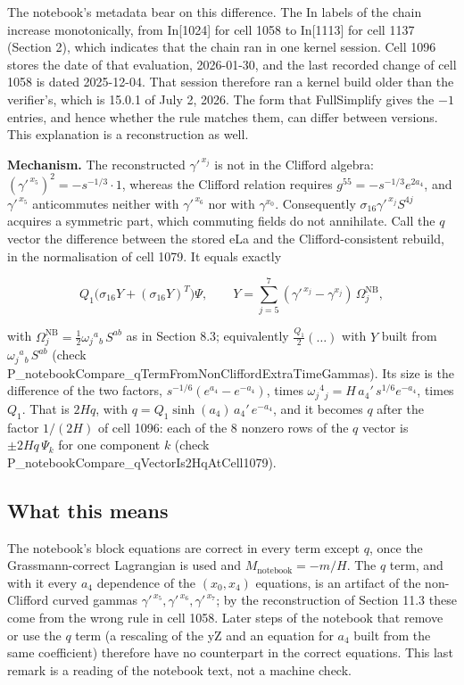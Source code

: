 \documentclass[11pt]{article}
\begin{document}
The notebook's metadata bear on this difference. The In labels of the chain increase monotonically, from In[1024] for cell 1058 to In[1113] for cell 1137 (Section 2), which indicates that the chain ran in one kernel session. Cell 1096 stores the date of that evaluation, 2026-01-30, and the last recorded change of cell 1058 is dated 2025-12-04. That session therefore ran a kernel build older than the verifier's, which is 15.0.1 of July 2, 2026. The form that FullSimplify gives the $-1$ entries, and hence whether the rule matches them, can differ between versions. This explanation is a reconstruction as well.

\textbf{Mechanism.} The reconstructed $\gamma'^{\,x_j}$ is not in the Clifford algebra: $(\gamma'^{\,x_5})^2=-s^{-1/3}\cdot1$, whereas the Clifford relation requires $g^{55}=-s^{-1/3}e^{2a_4}$, and $\gamma'^{\,x_5}$ anticommutes neither with $\gamma'^{\,x_6}$ nor with $\gamma^{x_0}$. Consequently $\sigma_{16}\gamma'^{\,x_j}S^{4j}$ acquires a symmetric part, which commuting fields do not annihilate. Call the $q$ vector the difference between the stored eLa and the Clifford-consistent rebuild, in the normalisation of cell 1079. It equals exactly

\[
Q_1\bigl(\sigma_{16}Y+(\sigma_{16}Y)^T\bigr)\Psi,\qquad Y=\sum_{j=5}^{7}(\gamma'^{\,x_j}-\gamma^{x_j})\,\Omega^{\mathrm{NB}}_j,
\]

with $\Omega^{\mathrm{NB}}_j=\tfrac12\omega_j{}^a{}_b\,S^{ab}$ as in Section 8.3; equivalently $\tfrac{Q_1}{2}(\dots)$ with $Y$ built from $\omega_j{}^a{}_b\,S^{ab}$ (check P\_notebookCompare\_qTermFromNonCliffordExtraTimeGammas). Its size is the difference of the two factors, $s^{-1/6}(e^{a_4}-e^{-a_4})$, times $\omega_j{}^4{}_j=H\,a_4'\,s^{1/6}e^{-a_4}$, times $Q_1$. That is $2Hq$, with $q=Q_1\sinh(a_4)\,a_4'\,e^{-a_4}$, and it becomes $q$ after the factor $1/(2H)$ of cell 1096: each of the 8 nonzero rows of the $q$ vector is $\pm2Hq\,\Psi_k$ for one component $k$ (check P\_notebookCompare\_qVectorIs2HqAtCell1079).

\subsection{What this means}

The notebook's block equations are correct in every term except $q$, once the Grassmann-correct Lagrangian is used and $M_{\mathrm{notebook}}=-m/H$. The $q$ term, and with it every $a_4$ dependence of the $(x_0,x_4)$ equations, is an artifact of the non-Clifford curved gammas $\gamma'^{\,x_5},\gamma'^{\,x_6},\gamma'^{\,x_7}$; by the reconstruction of Section 11.3 these come from the wrong rule in cell 1058. Later steps of the notebook that remove or use the $q$ term (a rescaling of the yZ and an equation for $a_4$ built from the same coefficient) therefore have no counterpart in the correct equations. This last remark is a reading of the notebook text, not a machine check.
\end{document}
